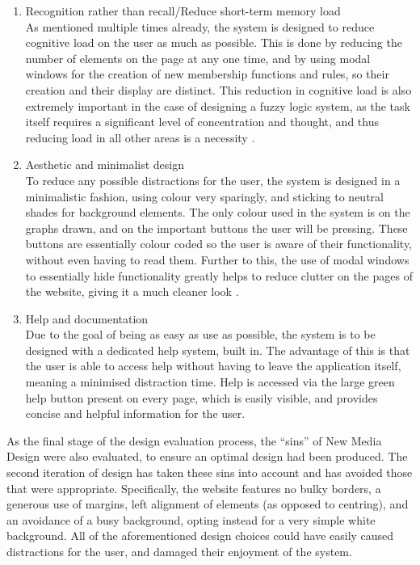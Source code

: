 \begin{enumerate}
\item Recognition rather than recall/Reduce short-term memory load\\
As mentioned multiple times already, the system is designed to reduce cognitive load on the user as much as possible. This is done by reducing the number of elements on the page at any one time, and by using modal windows for the creation of new membership functions and rules, so their creation and their display are distinct. This reduction in cognitive load is also extremely important in the case of designing a fuzzy logic system, as the task itself requires a significant level of concentration and thought, and thus reducing load in all other areas is a necessity \cite{sweller1994cognitive}.

\item Aesthetic and minimalist design\\
To reduce any possible distractions for the user, the system is designed in a minimalistic fashion, using colour very sparingly, and sticking to neutral shades for background elements. The only colour used in the system is on the graphs drawn, and on the important buttons the user will be pressing. These buttons are essentially colour coded so the user is aware of their functionality, without even having to read them. Further to this, the use of modal windows to essentially hide functionality greatly helps to reduce clutter on the pages of the website, giving it a much cleaner look \cite{depot2014clutter}.

\item Help and documentation\\
Due to the goal of being as easy as use as possible, the system is to be designed with a dedicated help system, built in. The advantage of this is that the user is able to access help without having to leave the application itself, meaning a minimised distraction time. Help is accessed via the large green help button present on every page, which is easily visible, and provides concise and helpful information for the user.

\end{enumerate}
\noindent 
As the final stage of the design evaluation process, the ``sins'' of New Media Design \cite{golombisky2013white} were also evaluated, to ensure an optimal design had been produced. The second iteration of design has taken these sins into account and has avoided those that were appropriate. Specifically, the website features no bulky borders, a generous use of margins, left alignment of elements (as opposed to centring), and an avoidance of a busy background, opting instead for a very simple white background. All of the aforementioned design choices could have easily caused distractions for the user, and damaged their enjoyment of the system.

